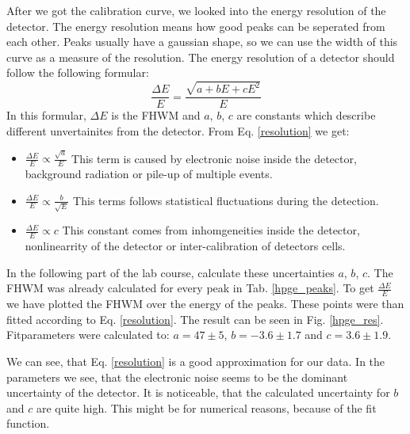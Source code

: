 After we got the calibration curve, we looked into the energy resolution of the detector.
The energy resolution means how good peaks can be seperated from each other.
Peaks usually have a gaussian shape, so we can use the width of this curve as a measure of the resolution.
The energy resolution of a detector should follow the following formular:
\begin{equation}
\frac{\Delta E}{E} = \frac{\sqrt{a + bE + cE^2}}{E}
\label{resolution}
\end{equation}
In this formular, $\Delta E$ is the FHWM and $a$, $b$, $c$ are constants which describe different unvertainites from the detector.
From Eq. \ref{resolution} we get:
\begin{itemize}
\item $\frac{\Delta E}{E} \propto \frac{\sqrt{a}}{E}$ This term is caused by electronic noise inside the detector, background radiation or pile-up of multiple events.
\item $\frac{\Delta E}{E} \propto \frac{b}{\sqrt{E}}$  This terms follows statistical fluctuations during the detection.
\item $\frac{\Delta E}{E} \propto c$ This constant comes from inhomgeneities inside the detector, nonlinearrity of the detector or inter-calibration of detectors cells.
\end{itemize}
In the following part of the lab course, calculate these uncertainties  $a$, $b$, $c$.
The FHWM was already calculated for every peak in Tab. \ref{hpge_peaks}.
To get $\frac{\Delta E}{E}$ we have plotted the FHWM over the energy of the peaks.
These points were than fitted according to Eq. \ref{resolution}.
The result can be seen in Fig. \ref{hpge_res}.
Fitparameters were calculated to: $a = 47 \pm 5$, $b = -3.6 \pm 1.7$ and $c = 3.6 \pm 1.9$.

We can see, that Eq. \ref{resolution} is a good approximation for our data.
In the parameters we see, that the electronic noise seems to be the dominant uncertainty of the detector.
It is noticeable, that the calculated uncertainty for $b$ and $c$  are quite high.
This might be for numerical reasons, because of the fit function.


